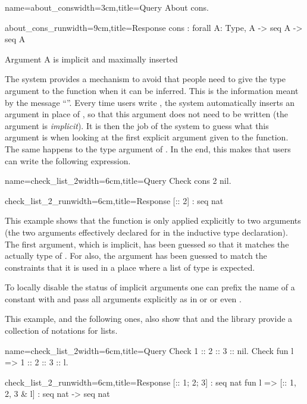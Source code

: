 \begin{coq}{name=about_cons}{width=3cm,title=Query}
About cons.
$~$
$~$
\end{coq}
\begin{coqout}{about_cons_run}{width=9cm,title=Response}
cons : forall A: Type, A -> seq A -> seq A

Argument A is implicit and maximally inserted
\end{coqout}

The \Coq{} system provides a mechanism to avoid that
people need to give the type argument to the  function when it
can be inferred.  This is
the information meant by the message ``''.  Every time users write , the system automatically
inserts an argument in place of , so that this argument does not
need to be written (the argument is {\em implicit}).  It is then the
job of the \Coq{} system to guess what this argument is when looking at
the first explicit argument given to the function.  The same happens
to the type argument of .  In the end, this makes that users can
write the following expression.

\begin{coq}{name=check_list_2}{width=6cm,title=Query}
Check cons 2 nil.
\end{coq}
\begin{coqout}{check_list_2_run}{width=6cm,title=Response}
[:: 2] : seq nat
\end{coqout}
\index[coq]{\C{(_ :: _)}}
This example shows that the function  is only applied
explicitly to two arguments (the two arguments effectively declared
for  in the inductive type declaration).
The first argument, which is implicit,
has been guessed so that it matches the actually type of .  For
 also, the argument has been guessed to match the constraints
that it is used in a place where a list of type  is expected.

To locally disable the
status of implicit arguments one can prefix the name of a
constant with  and pass all arguments explicitly as in
 or  or even
.

This example, and the following ones, also show
that \Coq{} and the \mcbMC{} library provide
a collection of notations for lists.

\begin{coq}{name=check_list_2}{width=6cm,title=Query}
Check 1 :: 2 :: 3 :: nil.
Check fun l => 1 :: 2 :: 3 :: l.
$~$
\end{coq}
\begin{coqout}{check_list_2_run}{width=6cm,title=Response}
[:: 1; 2; 3] : seq nat
fun l => [:: 1, 2, 3 & l]
  : seq nat -> seq nat
\end{coqout}
\index[coq]{\C{[:: .. , .. & ..]}}

